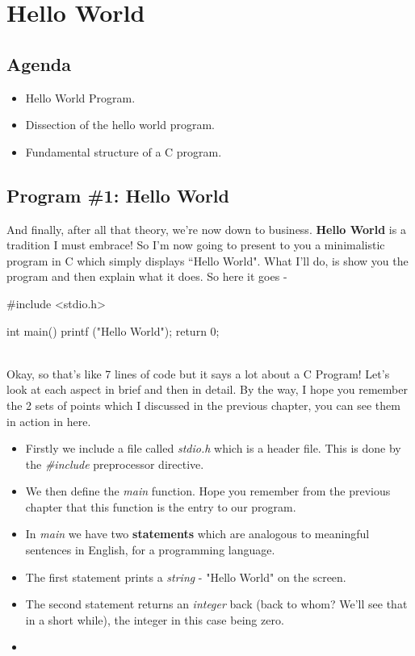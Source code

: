 \chapter{Hello World}


\section{Agenda}
\begin{itemize}
 \item Hello World Program.
 \item Dissection of the hello world program.
 \item Fundamental structure of a C program.
\end{itemize}

\section{Program \#1: Hello World}
And finally, after all that theory, we're now down to business. \textbf{Hello World} is a tradition I must embrace! So I'm now going to present to you a minimalistic program in C which simply displays ``Hello World". What I'll do, is show you the program and then explain what it does. So here it goes - \\

\begin{ccode}
#include <stdio.h>

int main()
{
  printf ("Hello World\n");
  return 0;
}
\end{ccode}
\\

Okay, so that's like 7 lines of code but it says a lot about a C Program! Let's look at each aspect in brief and then in detail. By the way, I hope you remember the 2 sets of points which I discussed in the previous chapter, you can see them in action in here.

\begin{itemize}
\item Firstly we include a file called \textit{stdio.h} which is a header file. This is done by the \textit{\#include} preprocessor directive.
\item We then define the \textit{main} function. Hope you remember from the previous chapter that this function is the entry to our program. 
\item In \textit{main} we have two \textbf{statements} which are analogous to meaningful sentences in English, for a programming language. 
\item The first statement prints a \textit{string} - "Hello World\n" on the screen. 
\item The second statement returns an \textit{integer} back (back to whom? We'll see that in a short while), the integer in this case being zero. 
\end{itemize}

\begin{itemize}
\item 
\end{itemize}
